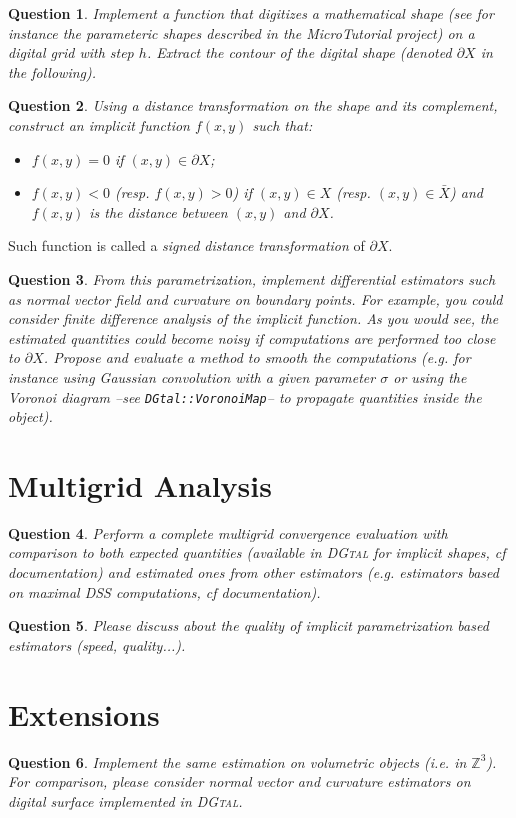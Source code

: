 \documentclass[a4paper, 11pt]{article}
\newtheorem{qu}{Question}
\begin{document}
\begin{qu}
  Implement a function that digitizes a mathematical shape (see for
  instance the parameteric shapes described in the MicroTutorial
  project) on a digital grid with step $h$. Extract the contour of the
  digital shape (denoted $\partial X$ in the following). 
\end{qu}

\begin{qu}
  Using a distance transformation on the shape and its complement,
  construct an implicit function $f(x,y)$ such that:
  \begin{itemize}
  \item $f(x,y)=0$ if $(x,y)\in \partial X$;
  \item $f(x,y)<0$ (resp. $f(x,y)>0$) if $(x,y)\in X$ (resp. $(x,y)\in
    \bar{X}$) and $f(x,y)$ is the distance between $(x,y)$ and $\partial X$.
  \end{itemize}
\end{qu}
Such function is called a \emph{signed distance transformation} of
$\partial X$.

\begin{qu}
  From this parametrization, implement differential estimators such as
  normal vector field and curvature on boundary points. For example,
  you could consider finite difference analysis of the implicit
  function. As you would see, the estimated quantities could become
  noisy if computations are performed too close to $\partial X$. Propose
  and evaluate a method to smooth the computations (\emph{e.g.} for
  instance using Gaussian convolution with a given parameter $\sigma$
  or using the Voronoi diagram --see \texttt{DGtal::VoronoiMap}-- to
  propagate quantities inside the object).
\end{qu}



\section{Multigrid Analysis}



\begin{qu}
  Perform a complete multigrid convergence evaluation with comparison
  to both expected quantities (available in \textsc{DGtal} for
  implicit shapes, cf  documentation) and estimated ones from other
  estimators (\emph{e.g.} estimators based on maximal DSS
  computations, cf documentation).
\end{qu}

\begin{qu}
  Please discuss about the quality of implicit parametrization based
  estimators (speed, quality...).
\end{qu}

\section{Extensions}


\begin{qu}
  Implement the same estimation on volumetric objects (\emph{i.e.} in
  $\mathbb{Z}^3$). For comparison, please consider normal vector and
  curvature estimators on digital surface implemented in \textsc{DGtal}.  
\end{qu}
\end{document}

